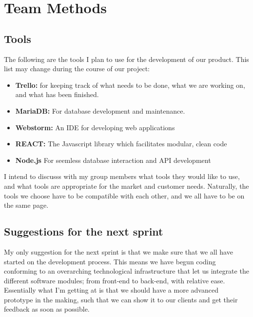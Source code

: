 \documentclass{exam}
\begin{document}
\section{Team Methods}
\subsection{Tools}
The following are the tools I plan to use for the development of our product. This list may change during the course of our project:\\
\begin{itemize}
\item \textbf{Trello:} for keeping track of what needs to be done, what we are working on, and what has been finished.
\item \textbf{MariaDB:} For database development and maintenance.
\item \textbf{Webstorm:} An IDE for developing web applications
\item \textbf{REACT:} The Javascript library which facilitates modular, clean code
\item \textbf{Node.js} For seemless database interaction and API development
\end{itemize}
\bigskip
I intend to discusss with my group members what tools they would like to use, and what tools are appropriate for the market and customer needs. Naturally, the tools we choose have to be compatible with each other, and we all have to be on the same page.\\
\bigskip

\subsection{Suggestions for the next sprint}
My only suggestion for the next sprint is that we make sure that we all have started on the development process. This means we have begun coding conforming to an overarching technological infrastructure that let us integrate the different software modules; from front-end to back-end, with relative ease. Essentially what I'm getting at is that we should have a more advanced prototype in the making, such that we can show it to our clients and get their feedback as soon as possible.\\
\bigskip
\end{document}
